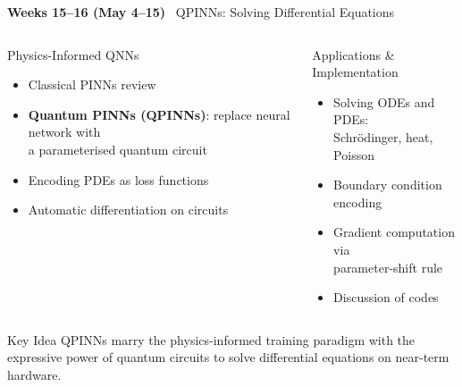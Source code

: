 \documentclass[aspectratio=169,10pt]{beamer}
\newcommand{\week}[1]{\textcolor{blue!60!black}{\textbf{#1}}}
\begin{document}
\begin{frame}{\week{Weeks 15--16 (May 4--15)} \ QPINNs: Solving Differential Equations}
  \begin{columns}[T]
      \begin{block}{Physics-Informed QNNs}
        \begin{itemize}
          \item Classical PINNs review
          \item \textbf{Quantum PINNs (QPINNs)}:
                replace neural network with\\
                a parameterised quantum circuit
          \item Encoding PDEs as loss functions
          \item Automatic differentiation on circuits
        \end{itemize}
      \end{block}
      \begin{block}{Applications \& Implementation}
        \begin{itemize}
          \item Solving ODEs and PDEs:\\
                Schrödinger, heat, Poisson
          \item Boundary condition encoding
          \item Gradient computation via\\
                parameter-shift rule
          \item Discussion of codes
        \end{itemize}
      \end{block}
  \end{columns}
  \vspace{4pt}
  \begin{alertblock}{Key Idea}
    QPINNs marry the physics-informed training paradigm with
    the expressive power of quantum circuits to solve differential
    equations on near-term hardware.
  \end{alertblock}
\end{frame}
\end{document}
